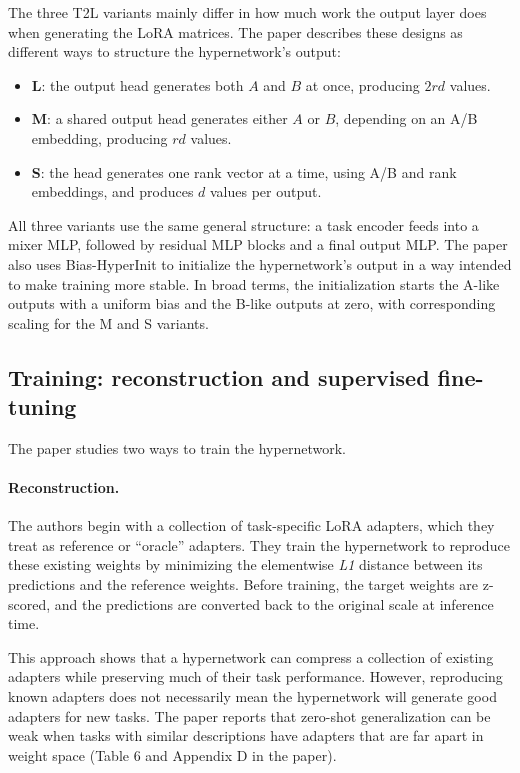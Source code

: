 \documentclass{article}
\begin{document}
The three T2L variants mainly differ in how much work the output layer does when generating the LoRA matrices. The paper describes these designs as different ways to structure the hypernetwork's output:

\begin{itemize}
  \item \textbf{L}: the output head generates both $A$ and $B$ at once, producing $2rd$ values.
  \item \textbf{M}: a shared output head generates either $A$ or $B$, depending on an A/B embedding, producing $rd$ values.
  \item \textbf{S}: the head generates one rank vector at a time, using A/B and rank embeddings, and produces $d$ values per output.
\end{itemize}

All three variants use the same general structure: a task encoder feeds into a mixer MLP, followed by residual MLP blocks and a final output MLP. The paper also uses Bias-HyperInit \cite{beck2023hyper} to initialize the hypernetwork's output in a way intended to make training more stable. In broad terms, the initialization starts the A-like outputs with a uniform bias and the B-like outputs at zero, with corresponding scaling for the M and S variants.

\subsection{Training: reconstruction and supervised fine-tuning}

The paper studies two ways to train the hypernetwork.

\paragraph{Reconstruction.}
The authors begin with a collection of task-specific LoRA adapters, which they treat as reference or ``oracle'' adapters. They train the hypernetwork to reproduce these existing weights by minimizing the elementwise \textit{L1} distance between its predictions and the reference weights. Before training, the target weights are z-scored, and the predictions are converted back to the original scale at inference time.

This approach shows that a hypernetwork can compress a collection of existing adapters while preserving much of their task performance. However, reproducing known adapters does not necessarily mean the hypernetwork will generate good adapters for new tasks. The paper reports that zero-shot generalization can be weak when tasks with similar descriptions have adapters that are far apart in weight space (Table 6 and Appendix D in the paper).
\end{document}
